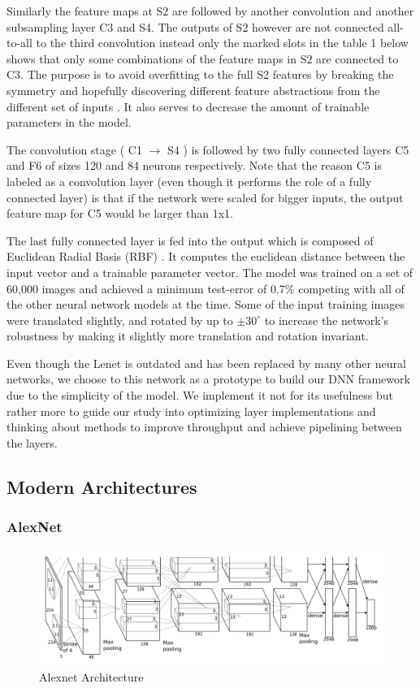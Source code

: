 Similarly the feature maps at S2 are followed by another convolution and another subsampling layer C3 and S4. The outputs of S2 however are not connected all-to-all to the third convolution instead only the marked slots in the table 1 below shows that only some combinations of the feature maps in S2 are connected to C3. The purpose is to avoid overfitting to the full S2 features by breaking the symmetry and hopefully discovering different feature abstractions from the different set of inputs \cite{lenet}. It also serves to decrease the amount of trainable parameters in the model. 

The convolution stage ( C1  $\rightarrow$ S4 ) is followed by two fully connected layers C5 and F6 of sizes 120 and 84 neurons respectively. Note that the reason C5 is labeled as a convolution layer (even though it performs the role of a fully connected layer) is that if the network were scaled for bigger inputs, the output feature map for C5 would be larger than 1x1. 

The last fully connected layer is fed into the output which is composed of Euclidean Radial Basis (RBF) \cite{chen1991orthogonal}. It computes the euclidean distance between the input vector and a trainable parameter vector. The model was trained on a set of 60,000 images and achieved a minimum test-error of 0.7\% competing with all of the other neural network models at the time. Some of the input training images were translated slightly, and rotated by up to $\pm{30^\circ}$ to increase the network’s robustness by making it slightly more translation and rotation invariant. 

Even though the Lenet is outdated and has been replaced by many other neural networks, we choose to this network as a prototype to build our DNN framework due to the simplicity of the model. We implement it not for its usefulness but rather more to guide our study into optimizing layer implementations and thinking about methods to improve throughput and achieve pipelining between the layers. 

\subsection{Modern Architectures} 

\subsubsection{AlexNet}

\begin{figure}[h!]
\centering
\includegraphics[width=1.0\textwidth]{Figures/alexnet}
\caption[AlexNet]{ Alexnet Architecture  \cite{alexnet}}
\label{fig:AlexNet Architecture}
\end{figure}

